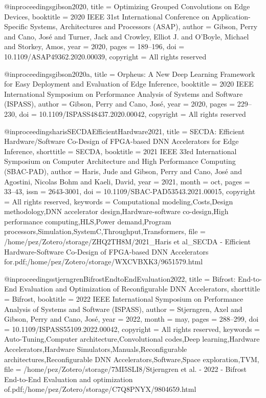 @inproceedings{gibson2020,
  title = {Optimizing Grouped Convolutions on Edge Devices},
  booktitle = {2020 {{IEEE}} 31st International Conference on Application-Specific Systems, Architectures and Processors ({{ASAP}})},
  author = {Gibson, Perry and Cano, Jos{\'e} and Turner, Jack and Crowley, Elliot J. and O'Boyle, Michael and Storkey, Amos},
  year = {2020},
  pages = {189--196},
  doi = {10.1109/ASAP49362.2020.00039},
  copyright = {All rights reserved}
}

@inproceedings{gibson2020a,
  title = {Orpheus: {{A}} New Deep Learning Framework for Easy Deployment and Evaluation of Edge Inference},
  booktitle = {2020 {{IEEE}} International Symposium on Performance Analysis of Systems and Software ({{ISPASS}})},
  author = {Gibson, Perry and Cano, Jos{\'e}},
  year = {2020},
  pages = {229--230},
  doi = {10.1109/ISPASS48437.2020.00042},
  copyright = {All rights reserved}
}

@inproceedings{harisSECDAEfficientHardware2021,
  title = {{{SECDA}}: {{Efficient Hardware}}/{{Software Co-Design}} of {{FPGA-based DNN Accelerators}} for {{Edge Inference}}},
  shorttitle = {{{SECDA}}},
  booktitle = {2021 {{IEEE}} 33rd {{International Symposium}} on {{Computer Architecture}} and {{High Performance Computing}} ({{SBAC-PAD}})},
  author = {Haris, Jude and Gibson, Perry and Cano, Jos{\'e} and Agostini, Nicolas Bohm and Kaeli, David},
  year = {2021},
  month = oct,
  pages = {33--43},
  issn = {2643-3001},
  doi = {10.1109/SBAC-PAD53543.2021.00015},
  copyright = {All rights reserved},
  keywords = {Computational modeling,Costs,Design methodology,DNN accelerator design,Hardware-software co-design,High performance computing,HLS,Power demand,Program processors,Simulation,SystemC,Throughput,Transformers},
  file = {/home/pez/Zotero/storage/ZHQ2TH8M/2021_Haris et al_SECDA - Efficient Hardware-Software Co-Design of FPGA-based DNN Accelerators for.pdf;/home/pez/Zotero/storage/WXCVBXK3/9651579.html}
}

@inproceedings{stjerngrenBifrostEndtoEndEvaluation2022,
  title = {Bifrost: {{End-to-End Evaluation}} and Optimization of {{Reconfigurable DNN Accelerators}}},
  shorttitle = {Bifrost},
  booktitle = {2022 {{IEEE International Symposium}} on {{Performance Analysis}} of {{Systems}} and {{Software}} ({{ISPASS}})},
  author = {Stjerngren, Axel and Gibson, Perry and Cano, Jos{\'e}},
  year = {2022},
  month = may,
  pages = {288--299},
  doi = {10.1109/ISPASS55109.2022.00042},
  copyright = {All rights reserved},
  keywords = {Auto-Tuning,Computer architecture,Convolutional codes,Deep learning,Hardware Accelerators,Hardware Simulators,Manuals,Reconfigurable architectures,Reconfigurable DNN Accelerators,Software,Space exploration,TVM},
  file = {/home/pez/Zotero/storage/7MI5SLI8/Stjerngren et al. - 2022 - Bifrost End-to-End Evaluation and optimization of.pdf;/home/pez/Zotero/storage/C7Q8PNYX/9804659.html}
}

